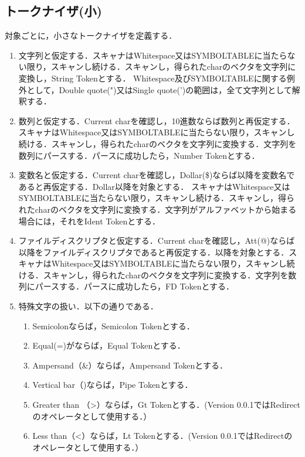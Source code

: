 \documentclass{article}
\begin{document}
\subsection{トークナイザ(小)}
対象ごとに，小さなトークナイザを定義する．
    \begin{enumerate}
        \item 文字列と仮定する．スキャナはWhitespace又はSYMBOLTABLEに当たらない限り，スキャンし続ける．スキャンし，得られたcharのベクタを文字列に変換し，String Tokenとする．\newline
        Whitespace及びSYMBOLTABLEに関する例外として，Double quote(")又はSingle quote(')の範囲は，全て文字列として解釈する．
        \item 数列と仮定する．Current charを確認し，10進数ならば数列と再仮定する．スキャナはWhitespace又はSYMBOLTABLEに当たらない限り，スキャンし続ける．スキャンし，得られたcharのベクタを文字列に変換する．文字列を数列にパースする．パースに成功したら，Number Tokenとする．
        \item 変数名と仮定する．Current charを確認し，Dollar(\$)ならば以降を変数名であると再仮定する．Dollar以降を対象とする．
        スキャナはWhitespace又はSYMBOLTABLEに当たらない限り，スキャンし続ける．スキャンし，得られたcharのベクタを文字列に変換する．文字列がアルファベットから始まる場合には，それをIdent Tokenとする．
        \item ファイルディスクリプタと仮定する．Current charを確認し，Att(@)ならば以降をファイルディスクリプタであると再仮定する．以降を対象とする．スキャナはWhitespace又はSYMBOLTABLEに当たらない限り，スキャンし続ける．スキャンし，得られたcharのベクタを文字列に変換する．文字列を数列にパースする．パースに成功したら，FD Tokenとする．
        \item 特殊文字の扱い．以下の通りである．
            \begin{enumerate}
                \item Semicolonならば，Semicolon Tokenとする．
                \item Equal(=)がならば，Equal Tokenとする．
                \item Ampersand（\&）ならば，Ampersand Tokenとする．
                \item Vertical bar（\textbar)ならば，Pipe Tokenとする．
                \item Greater than （\textgreater）ならば，Gt Tokenとする．(Version 0.0.1ではRedirectのオペレータとして使用する．）
                \item Less than（\textless）ならば，Lt Tokenとする．(Version 0.0.1ではRedirectのオペレータとして使用する．）

\end{enumerate}
\end{enumerate}
\end{document}

